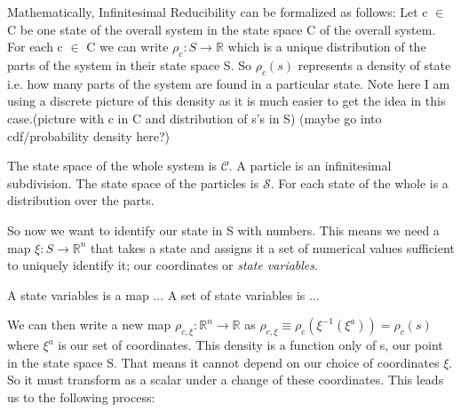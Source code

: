 \documentclass{article}
\begin{document}
Mathematically, Infinitesimal Reducibility can be formalized as follows: Let c $\in$ C be one state of the overall system in the state space C of the overall system. For each c $\in$ C we can write $\rho_c: S \rightarrow \mathbb{R}$ which is a unique distribution of the parts of the system in their state space S. So $\rho_c(s)$ represents a density of state i.e. how many parts of the system are found in a particular state. Note here I am using a discrete picture of this density as it is much easier to get the idea in this case.(picture with c in C and distribution of s's in S) (maybe go into cdf/probability density here?)

\begin{defn}
	The state space of the whole system is $\mathcal{C}$. A particle is an infinitesimal subdivision. The state space of the particles is $\mathcal{S}$. For each state of the whole is a distribution over the parts.
\end{defn}

 So now we want to identify our state in S with numbers. This means we need a map $\xi : S \rightarrow \mathbb{R}^n $ that takes a state and assigns it a set of numerical values sufficient to uniquely identify it; our coordinates or \textit{state variables}.

\begin{defn}
	A state variables is a map ... A set of state variables is ...
\end{defn}

 We can then write a new map $\rho_{c,\xi} : \mathbb{R}^n \rightarrow \mathbb{R}$ as $\rho_{c,\xi} \equiv \rho_c(\xi^{-1}(\xi^a)) = \rho_c(s)$ where $\xi^a$ is our set of coordinates. This density is a function only of s, our point in the state space S. That means it cannot depend on our choice of coordinates $\xi$. So it must transform as a scalar under a change of these coordinates. This leads us to the following process:
	
\end{document}
